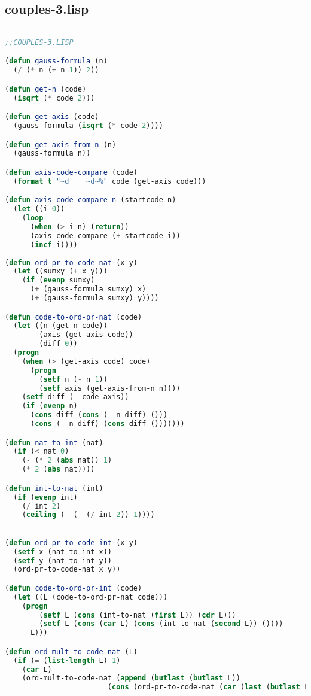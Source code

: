 \documentclass{article}
\begin{document}
\subsection{couples-3.lisp}
\label{couples3lisp}
\begin{lstlisting}[language=Lisp, basicstyle=\footnotesize]

;;COUPLES-3.LISP

(defun gauss-formula (n)
  (/ (* n (+ n 1)) 2))

(defun get-n (code)
  (isqrt (* code 2)))

(defun get-axis (code)
  (gauss-formula (isqrt (* code 2))))

(defun get-axis-from-n (n)
  (gauss-formula n))

(defun axis-code-compare (code)
  (format t "~d    ~d~%" code (get-axis code))) 

(defun axis-code-compare-n (startcode n)
  (let ((i 0))
    (loop
      (when (> i n) (return))
      (axis-code-compare (+ startcode i))
      (incf i))))
  
(defun ord-pr-to-code-nat (x y)
  (let ((sumxy (+ x y)))
    (if (evenp sumxy)
      (+ (gauss-formula sumxy) x)
      (+ (gauss-formula sumxy) y))))

(defun code-to-ord-pr-nat (code)
  (let ((n (get-n code))
        (axis (get-axis code))
        (diff 0))
  (progn
    (when (> (get-axis code) code)
      (progn
        (setf n (- n 1))
        (setf axis (get-axis-from-n n))))
    (setf diff (- code axis))
    (if (evenp n)
      (cons diff (cons (- n diff) ()))
      (cons (- n diff) (cons diff ()))))))

(defun nat-to-int (nat)
  (if (< nat 0)
    (- (* 2 (abs nat)) 1)
    (* 2 (abs nat))))

(defun int-to-nat (int)
  (if (evenp int)
    (/ int 2) 
    (ceiling (- (- (/ int 2)) 1))))
    

(defun ord-pr-to-code-int (x y)
  (setf x (nat-to-int x))
  (setf y (nat-to-int y))
  (ord-pr-to-code-nat x y))

(defun code-to-ord-pr-int (code)
  (let ((L (code-to-ord-pr-nat code)))
    (progn
        (setf L (cons (int-to-nat (first L)) (cdr L)))
        (setf L (cons (car L) (cons (int-to-nat (second L)) ())))
      L)))  

(defun ord-mult-to-code-nat (L)
  (if (= (list-length L) 1)
    (car L)
    (ord-mult-to-code-nat (append (butlast (butlast L)) 
                        (cons (ord-pr-to-code-nat (car (last (butlast L))) (car (last L))) ())))))


\end{lstlisting}
\end{document}
